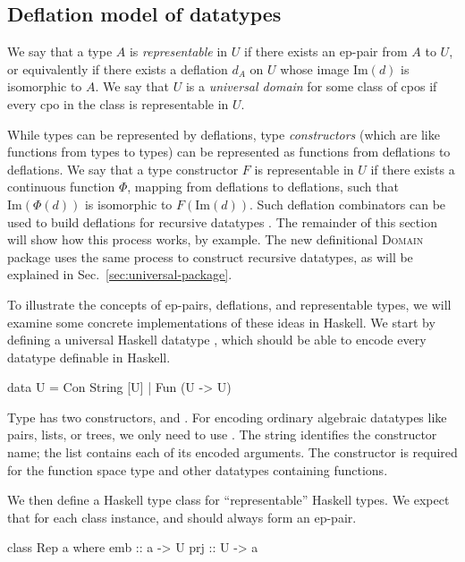 \subsection{Deflation model of datatypes}
\label{sec:universal-deflation}

We say that a type $A$ is \emph{representable} in $U$ if there exists an ep-pair from $A$ to $U$, or equivalently if there exists a deflation $d_A$ on $U$ whose image $\mathrm{Im}(d)$ is isomorphic to $A$. We say that $U$ is a \emph{universal domain} for some class of cpos if every cpo in the class is representable in $U$.

While types can be represented by deflations, type \emph{constructors} (which are like functions from types to types) can be represented as functions from deflations to deflations. We say that a type constructor $F$ is representable in $U$ if there exists a continuous function $\Phi$, mapping from deflations to deflations, such that $\mathrm{Im}(\Phi(d))$ is isomorphic to $F(\mathrm{Im}(d))$. Such deflation combinators can be used to build deflations for recursive datatypes \cite[\S7]{gunter90semantic}. The remainder of this section will show how this process works, by example. The new definitional \textsc{Domain} package uses the same process to construct recursive datatypes, as will be explained in Sec.~\ref{sec:universal-package}.

To illustrate the concepts of ep-pairs, deflations, and representable types, we will examine some concrete implementations of these ideas in Haskell. We start by defining a universal Haskell datatype , which should be able to encode every datatype definable in Haskell.
%
\begin{hscode}
data U = Con String [U] | Fun (U -> U)
\end{hscode}
%
Type  has two constructors,  and . For encoding ordinary algebraic datatypes like pairs, lists, or trees, we only need to use . The string identifies the constructor name; the list contains each of its encoded arguments. The constructor  is required for the function space type \hs{(->)} and other datatypes containing functions.

We then define a Haskell type class  for ``representable'' Haskell types. We expect that for each  class instance,  and  should always form an ep-pair.
%
\begin{hscode}
class Rep a where
  emb :: a -> U
  prj :: U -> a
\end{hscode}

